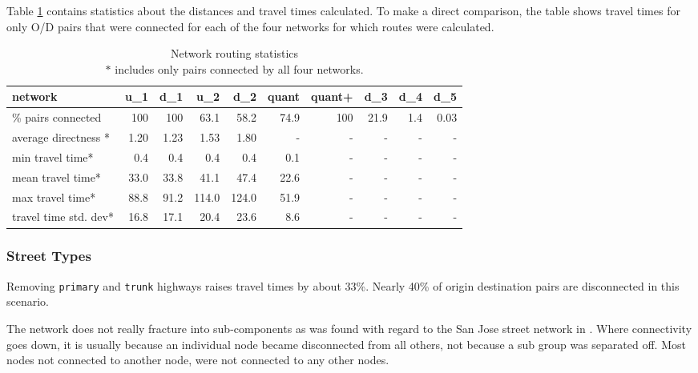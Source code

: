 Table \ref{table:travel_time_stats} contains statistics about the distances and travel times calculated. To make a direct comparison, the table shows travel times for only O/D pairs that were connected for each of the four networks for which routes were calculated.  

\begin{table}[]
\begin{tabular}{lrrrrrrrrr}
\toprule
network                  & u\_1    & d\_1    & u\_2  & d\_2  & quant & quant+ & d\_3 & d\_4 & d\_5 \\ \midrule
\% pairs connected       & 100     & 100     &  63.1 & 58.2  & 74.9  & 100    & 21.9 & 1.4  & 0.03 \\
average directness *     & 1.20    & 1.23    & 1.53  & 1.80  & -     & -      & -    & -    & -    \\
min travel time*         & 0.4     & 0.4     & 0.4   & 0.4   & 0.1   & -      & -    & -    & -    \\
mean travel time*        & 33.0    & 33.8    & 41.1  & 47.4  & 22.6  & -      & -    & -    & -    \\
max travel time*         & 88.8    & 91.2    & 114.0 & 124.0 & 51.9  & -      & -    & -    & -    \\
travel time std. dev*    & 16.8    & 17.1    & 20.4  & 23.6  & 8.6   & -      & -    & -    & -   \\ \bottomrule
\end{tabular}
\caption{Network routing statistics \\ $*$ includes only pairs connected by all four networks.}
\label{table:travel_time_stats}
\end{table}

\subsubsection{Street Types}

Removing \texttt{primary} and \texttt{trunk} highways raises travel times by about 33\%. Nearly 40\% of origin destination pairs are disconnected in this scenario. 

The network does not really fracture into sub-components as was found with regard to the San Jose street network in \textcite{furth2016network}. Where connectivity goes down, it is usually because an individual node became disconnected from all others, not because a sub group was separated off. Most nodes not connected to another node, were not connected to any other nodes. 

